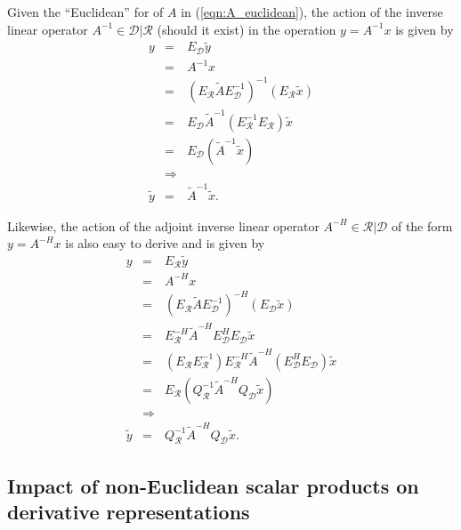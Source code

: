 Given the ``Euclidean'' for of $A$ in (\ref{eqn:A_euclidean}), the action of
the inverse linear operator $A^{-1}\in\mathcal{D}|\mathcal{R}$ (should it
exist) in the operation $y = A^{-1} x$ is given by
%
\begin{eqnarray}
y
& = & E_{\mathcal{D}} \tilde{y} \nonumber \\
& = & A^{-1} x \nonumber \\
& = & (E_{\mathcal{R}} \tilde{A} E_{\mathcal{D}}^{-1})^{-1} (E_{\mathcal{R}} \tilde{x}) \nonumber \\
& = & E_{\mathcal{D}} \tilde{A}^{-1} (E_{\mathcal{R}}^{-1} E_{\mathcal{R}}) \tilde{x}  \nonumber \\
& = & E_{\mathcal{D}} ( \tilde{A}^{-1} \tilde{x} ) \nonumber \\
& \Rightarrow &  \nonumber \\
\tilde{y} & = & \tilde{A}^{-1} \tilde{x}.
\label{eqn:A_euclidean_matrix_inverse_apply}
\end{eqnarray}
%

Likewise, the action of the adjoint inverse linear operator
$A^{-H}\in\mathcal{R}|\mathcal{D}$ of the form $y = A^{-H} x$ is also easy to
derive and is given by
%
\begin{eqnarray}
y
& = & E_{\mathcal{R}} \tilde{y} \nonumber \\
& = & A^{-H} x \nonumber \\
& = & (E_{\mathcal{R}} \tilde{A} E_{\mathcal{D}}^{-1})^{-H} (E_{\mathcal{D}} \tilde{x}) \nonumber \\
& = & E_{\mathcal{R}}^{-H} \tilde{A}^{-H} E_{\mathcal{D}}^H E_{\mathcal{D}} \tilde{x}  \nonumber \\
& = & ( E_{\mathcal{R}} E_{\mathcal{R}}^{-1} ) E_{\mathcal{R}}^{-H} \tilde{A}^{-H} ( E_{\mathcal{D}}^H E_{\mathcal{D}} ) \tilde{x}  \nonumber \\
& = & E_{\mathcal{R}} ( Q_{\mathcal{R}}^{-1} \tilde{A}^{-H} Q_{\mathcal{D}} \tilde{x} ) \nonumber \\
& \Rightarrow &  \nonumber \\
\tilde{y} & = & Q_{\mathcal{R}}^{-1} \tilde{A}^{-H} Q_{\mathcal{D}} \tilde{x}.
\label{eqn:A_euclidean_matrix_adjoint_inverse_apply}
\end{eqnarray}
%

\subsection{Impact of non-Euclidean scalar products on derivative representations}

